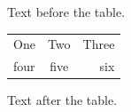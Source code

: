 \documentclass[12pt]{article}
\begin{document}
Text before the table.

\begin{tabular}{|l|c|r|}One & Two & Three\\four & five & six\end{tabular}

Text after the table.
\end{document}
